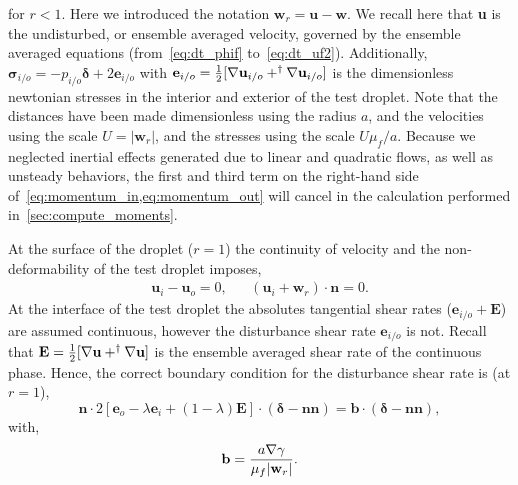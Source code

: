for $r<1$. 
Here we introduced the notation $\textbf{w}_r = \textbf{u} - \textbf{w}$.  
We recall here that \textbf{u} is the undisturbed, or ensemble averaged velocity, governed by the ensemble averaged equations (from~\ref{eq:dt_phif} to~\eqref{eq:dt_uf2}).
Additionally, $\bm\sigma_{i/o} = -p_{i/o}\bm\delta + 2\textbf{e}_{i/o}$ with $\textbf{e}_{i/o} = \frac{1}{2}[\mathbf{\nabla} \textbf{u}_{i/o} + ^{\dagger}\mathbf{\nabla} \textbf{u}_{i/o}]$ is the dimensionless newtonian stresses in the interior and exterior of the test droplet. 
Note that the distances have been made dimensionless using the radius $a$, and the velocities using the scale $U = |\textbf{w}_r|$, and the stresses using the scale $U\mu_f /a$. 
Because we neglected inertial effects generated due to linear and quadratic flows, as well as unsteady behaviors, the first and third term on the right-hand side of~\ref{eq:momentum_in,eq:momentum_out} will cancel in the calculation performed in~\ref{sec:compute_moments}. 


At the surface of the droplet ($r = 1$) the continuity of velocity and the non-deformability of the test droplet imposes, 
\begin{align}
    \textbf{u}_{i} - \textbf{u}_{o}= 0,
    && 
    (\textbf{u}_{i}+\textbf{w}_r) \cdot \textbf{n}
    =
    0.
    \label{eq:normal_vel}
\end{align} 
At the interface of the test droplet the absolutes tangential shear rates ($\textbf{e}_{i/o}+\textbf{E}$) are assumed continuous, however the disturbance shear rate $\textbf{e}_{i/o}$ is not. 
Recall that $\textbf{E} =\frac{1}{2} [\mathbf{\nabla} \textbf{u} + ^\dagger \mathbf{\nabla} \textbf{u}]$ is the ensemble averaged shear rate of the continuous phase.
Hence, the correct boundary condition for the disturbance shear rate is (at $r=1$),
\begin{equation}
    \mathbf{n}\cdot 2 [\textbf{e}_{o} - \lambda \textbf{e}_{i} + (1-\lambda)\textbf{E}
    ]\cdot (\bm\delta - \textbf{nn})
    =
    \textbf{b}\cdot (\bm\delta - \textbf{nn}),
    \label{eq:boundary_cdt_stress}
\end{equation}
with, 
\begin{equation}
    \textbf{b}
    =
    \frac{a \mathbf{\nabla} \gamma}{\mu_f |\textbf{w}_r|}. 
\end{equation}

